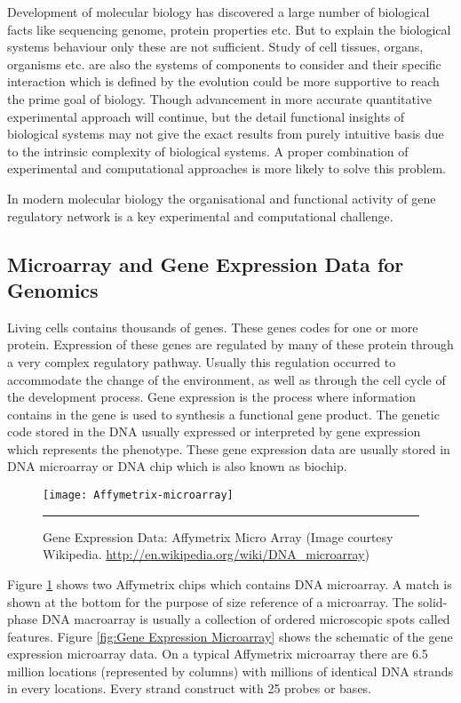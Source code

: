 Development of molecular biology has discovered a large number of biological facts like sequencing genome, protein properties etc. But to explain the biological systems behaviour only these are not sufficient. Study of cell tissues, organs, organisms etc. are also the systems of components to consider and their specific interaction which is defined by the evolution could be more supportive to reach the prime goal of biology. Though advancement in more accurate quantitative experimental approach will continue, but the detail functional insights of biological systems may not give the exact results from purely intuitive basis due to the intrinsic complexity of biological systems. A proper combination of experimental and computational approaches is more likely to solve this problem.

In modern molecular biology the organisational and functional activity of gene regulatory network is a key experimental and computational challenge.

\subsection{Microarray and Gene Expression Data for Genomics }
Living cells contains thousands of genes. These genes codes for one or more protein. Expression of these genes are regulated by many of these protein through a very complex regulatory pathway. Usually this regulation occurred to accommodate the change of the environment, as well as through the cell cycle of the development process. %
Gene expression is the process where information contains in the gene is used to synthesis a functional gene product. The genetic code stored in the DNA usually expressed or interpreted by gene expression which represents the  phenotype. These gene expression data are usually stored in DNA microarray or DNA chip which is also known as biochip. 

\begin{figure}[htbp!]
	\centering
	\texttt{[image: Affymetrix-microarray]}
		\rule{35em}{0.5pt}
	\caption[Affymetrix Micro Array]{Gene Expression Data: Affymetrix Micro Array
	(Image courtesy Wikipedia. 
	\url{http://en.wikipedia.org/wiki/DNA_microarray})}
	\label{fig:Affymetrix-microarray}
\end{figure}
 
Figure \ref{fig:Affymetrix-microarray} shows two Affymetrix chips which contains DNA microarray. A match is shown at the bottom for the purpose of size reference of a microarray. The solid-phase DNA macroarray is usually a collection of ordered microscopic spots called features. Figure \ref{fig:Gene Expression Microarray} shows the schematic of the gene expression microarray data. On a typical Affymetrix microarray there are 6.5 million locations (represented by columns) with millions of identical DNA strands in every locations. Every strand construct with 25 probes or bases. 

